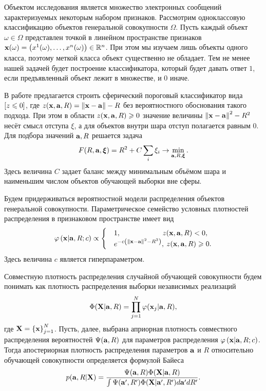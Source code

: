 Объектом исследования является множество электронных сообщений характеризуемых некоторым набором признаков.
Рассмотрим одноклассовую классификацию объектов генеральной совокупности $\Omega$.
Пусть каждый объект $\omega \in{\Omega}$  представлен точкой в линейном пространстве признаков
$\boldsymbol{\mathbf{x}}(\omega)=\left(x^1(\omega),\ldots, x^n(\omega)\right) \in {\mathbb R^n}$. При этом мы изучаем лишь объекты одного класса, поэтому меткой класса объект существенно не обладает. 
Тем не менее нашей задачей будет построение классификатора, который будет давать ответ $1$, если предъявленный объект лежит в множестве, и $0$ иначе.

В работе \cite{Tax2001}  предлагается строить сферический пороговый классификатор вида 
$\left[z \leqslant 0\right] $, где $z(\boldsymbol{\mathbf{x}},\boldsymbol{\mathbf{a}},R)=\left\|{\boldsymbol{\mathbf{x}}-\boldsymbol{\mathbf{a}}}\right\|-R$ без вероятностного обоснования такого подхода. При этом в области $z(\boldsymbol{\mathbf{x}}, \boldsymbol{\mathbf{a}}, R) \geqslant 0$ значение величины $\left\|{\boldsymbol{\mathbf{x}}-\boldsymbol{\mathbf{a}}}\right\|^2-R^2$ несёт смысл отступа $\xi$, а для объектов внутри шара отступ полагается равным 0. Для подбора значений $\boldsymbol{\mathbf{a}}, R$ решается задача
\begin{equation}
	\label{min:noprob}
	F(R,\boldsymbol{\mathbf{a}}, \boldsymbol{\mathbf{\xi}}) = R^2 + C\sum_i\xi_i \to \min_{\boldsymbol{\mathbf{a}}, R, \boldsymbol{\mathbf{\xi}}}.
\end{equation}
Здесь величина $C$ задает баланс между минимальным объёмом шара и наименьшим числом объектов обучающей выборки вне сферы.


Будем придерживаться вероятностной модели распределения объектов генеральной совокупности.
Параметрическое семейство условных плотностей распределения в признаковом пространстве имеет вид 
\begin{equation}
	\label{PhiXARC}
	\varphi \left( {\boldsymbol{\mathbf{x}} | \boldsymbol{\mathbf{a}},R;c} \right) \propto
		\begin{cases}
			&1, 		\qquad\qquad\qquad  	\! 	z(\boldsymbol{\mathbf{x}},\boldsymbol{\mathbf{a}},R) < 0, \\
			&e^{-c \left(\left\|{\boldsymbol{\mathbf{x}}-\boldsymbol{\mathbf{a}}}\right\|^2-R^2\right)}, 	\:	z(\boldsymbol{\mathbf{x}},\boldsymbol{\mathbf{a}},R) \geqslant 0.
		\end{cases} 
\end{equation}
Здесь величина $c$ является гиперпараметром.


Совместную плотность распределения случайной обучающей совокупности будем понимать как плотность распределения выборки независимых реализаций
$$\Phi(\boldsymbol{\mathbf{X}}|\boldsymbol{\mathbf{a}},R)=\prod_{j=1}^N \varphi(\boldsymbol{\mathbf{x}}_j|\boldsymbol{\mathbf{a}},R),$$ 
где $\boldsymbol{\mathbf{X}}=\left\{\boldsymbol{\mathbf{x}}\right\}_{j=1}^N$.
Пусть, далее, выбрана априорная плотность совместного распределения вероятностей $\Psi(\boldsymbol{\mathbf{a}},R)$ для параметров распределения $\varphi \left(\boldsymbol{\mathbf{x}} | \boldsymbol{\mathbf{a}},R;c\right)$. 
Тогда апостериорная плотность распределения параметров $\boldsymbol{\mathbf{a}}$ и $R$ относительно обучающей совокупности определяется формулой Байеса
\begin{equation}
	\label{Prob:aRX}
	p(\boldsymbol{\mathbf{a}},R|\boldsymbol{\mathbf{X}})
	= \frac {\Psi(\boldsymbol{\mathbf{a}},R) \Phi(\boldsymbol{\mathbf{X}}|\boldsymbol{\mathbf{a}},R)}
			{\int {\Psi(\ensuremath{\boldsymbol{\mathbf{a}}}',R') \Phi(\ensuremath{\boldsymbol{\mathbf{X}}}|\ensuremath{\boldsymbol{\mathbf{a}}}',R')d\ensuremath{\boldsymbol{\mathbf{a}}}'dR'}}.
\end{equation}

